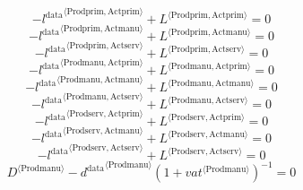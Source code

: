 \begin{equation}
-{l^{\mathrm{data}}}^{\langle \mathrm{\mathrm{Prodprim}},\mathrm{\mathrm{Actprim}}\rangle} + {L}^{\langle \mathrm{Prodprim},\mathrm{Actprim}\rangle} = 0
\end{equation}
\begin{equation}
-{l^{\mathrm{data}}}^{\langle \mathrm{\mathrm{Prodprim}},\mathrm{\mathrm{Actmanu}}\rangle} + {L}^{\langle \mathrm{Prodprim},\mathrm{Actmanu}\rangle} = 0
\end{equation}
\begin{equation}
-{l^{\mathrm{data}}}^{\langle \mathrm{\mathrm{Prodprim}},\mathrm{\mathrm{Actserv}}\rangle} + {L}^{\langle \mathrm{Prodprim},\mathrm{Actserv}\rangle} = 0
\end{equation}
\begin{equation}
-{l^{\mathrm{data}}}^{\langle \mathrm{\mathrm{Prodmanu}},\mathrm{\mathrm{Actprim}}\rangle} + {L}^{\langle \mathrm{Prodmanu},\mathrm{Actprim}\rangle} = 0
\end{equation}
\begin{equation}
-{l^{\mathrm{data}}}^{\langle \mathrm{\mathrm{Prodmanu}},\mathrm{\mathrm{Actmanu}}\rangle} + {L}^{\langle \mathrm{Prodmanu},\mathrm{Actmanu}\rangle} = 0
\end{equation}
\begin{equation}
-{l^{\mathrm{data}}}^{\langle \mathrm{\mathrm{Prodmanu}},\mathrm{\mathrm{Actserv}}\rangle} + {L}^{\langle \mathrm{Prodmanu},\mathrm{Actserv}\rangle} = 0
\end{equation}
\begin{equation}
-{l^{\mathrm{data}}}^{\langle \mathrm{\mathrm{Prodserv}},\mathrm{\mathrm{Actprim}}\rangle} + {L}^{\langle \mathrm{Prodserv},\mathrm{Actprim}\rangle} = 0
\end{equation}
\begin{equation}
-{l^{\mathrm{data}}}^{\langle \mathrm{\mathrm{Prodserv}},\mathrm{\mathrm{Actmanu}}\rangle} + {L}^{\langle \mathrm{Prodserv},\mathrm{Actmanu}\rangle} = 0
\end{equation}
\begin{equation}
-{l^{\mathrm{data}}}^{\langle \mathrm{\mathrm{Prodserv}},\mathrm{\mathrm{Actserv}}\rangle} + {L}^{\langle \mathrm{Prodserv},\mathrm{Actserv}\rangle} = 0
\end{equation}
\begin{equation}
{D}^{\langle \mathrm{Prodmanu}\rangle} - {{d^{\mathrm{data}}}^{\langle \mathrm{\mathrm{Prodmanu}}\rangle}} \left(1 + {{v\!a\!t}}^{\langle \mathrm{\mathrm{Prodmanu}}\rangle}\right)^{-1} = 0
\end{equation}
